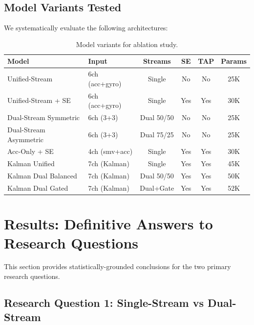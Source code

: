 \documentclass{article}
\begin{document}
\subsection{Model Variants Tested}

We systematically evaluate the following architectures:

\begin{table}[htbp]
    \centering
    \caption{Model variants for ablation study.}
    \label{tab:model_variants}
    \small
    \begin{tabular}{llcccc}
        \toprule
        \textbf{Model} & \textbf{Input} & \textbf{Streams} & \textbf{SE} & \textbf{TAP} & \textbf{Params} \\
        \midrule
        Unified-Stream & 6ch (acc+gyro) & Single & No & No & 25K \\
        Unified-Stream + SE & 6ch (acc+gyro) & Single & Yes & Yes & 30K \\
        Dual-Stream Symmetric & 6ch (3+3) & Dual 50/50 & No & No & 25K \\
        Dual-Stream Asymmetric & 6ch (3+3) & Dual 75/25 & No & No & 25K \\
        Acc-Only + SE & 4ch (smv+acc) & Single & Yes & Yes & 30K \\
        Kalman Unified & 7ch (Kalman) & Single & Yes & Yes & 45K \\
        Kalman Dual Balanced & 7ch (Kalman) & Dual 50/50 & Yes & Yes & 50K \\
        Kalman Dual Gated & 7ch (Kalman) & Dual+Gate & Yes & Yes & 52K \\
        \bottomrule
    \end{tabular}
\end{table}

\section{Results: Definitive Answers to Research Questions}
\label{sec:results_rq}

This section provides statistically-grounded conclusions for the two primary research questions.

\subsection{Research Question 1: Single-Stream vs Dual-Stream}
\end{document}
